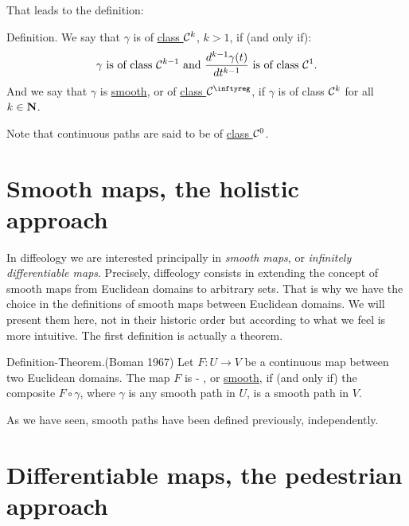 That leads to the definition:

\begin{Article}{Definition.}{\itshape}
  We say that $\gamma$ is of \underline{class ${\mathcal{C}}^{k}$},
  $k>1$,
  if (and only if):
  $$%
    \gamma \text{ is of class } \Ck{k-1} \text{ and } \frac{d^{k-1}\gamma(t)}{dt^{k-1}} \text{ is of class } \Ck{1}.
    $$%
  And we say that $\gamma$ is \underline{smooth},
  or of \underline{class $\Cinfty$},
  if $\gamma$ is of class ${\mathcal{C}}^{k}$ for all $k \in \mathbf{N}$.
\end{Article}
%
Note that continuous paths are said to be of \underline{class ${\mathcal{C}}^0$}.


\section{Smooth maps, the holistic approach}

In diffeology we are interested principally in {\itshape smooth maps},
or {\itshape infinitely differentiable maps}.
Precisely,
diffeology consists in extending the concept of smooth maps from Euclidean domains to arbitrary sets.
That is why we have the choice in the definitions of smooth maps between Euclidean domains.
We will present them here,
not in their historic order but according to what we feel is more intuitive.
The first definition is actually a theorem.

\begin{Article}{Definition-Theorem.}{\itshape}{\upshape (Boman 1967)}\label{Boman-theorem}
  Let $F \colon U \to V$ be a continuous map between two Euclidean domains.
  The map $F$ is - , %
  or \underline{smooth},
  if (and only if) the composite $F \circ \gamma$,
  where $\gamma$ is any smooth path in $U$,
  is a smooth path in $V$.
\end{Article}

As we have seen,
smooth paths have been defined previously,
independently.


\section{Differentiable maps, the pedestrian approach}

